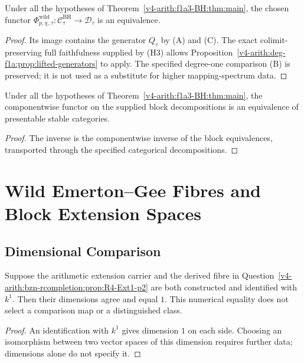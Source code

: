\begin{theorem}
\label{v4-arith:f1a3-BH:thm:single-block-exhaustion}
Under all the hypotheses of Theorem~\ref{v4-arith:f1a3-BH:thm:main},
the chosen functor \(\Phi^{\mathrm{wild}}_{p,\chi,\tau}:
\mathcal C_\tau^{\mathrm{BH}}\to\mathcal D_\tau\) is an equivalence.
\end{theorem}
\begin{proof}
Its image contains the generator \(Q_\tau\) by (A) and (C).
The exact colimit-preserving full faithfulness supplied by (H3)
allows Proposition~\ref{v4-arith:deg-f1a:prop:lifted-generators}
to apply. The specified degree-one comparison (B) is preserved;
it is not used as a substitute for higher mapping-spectrum data.
\end{proof}

\begin{corollary}
\label{v4-arith:f1a3-BH:cor:BH-assembly}
Under all the hypotheses of Theorem~\ref{v4-arith:f1a3-BH:thm:main},
the componentwise functor on the supplied block decompositions is
an equivalence of presentable stable categories.
\end{corollary}
\begin{proof}
The inverse is the componentwise inverse of the block equivalences,
transported through the specified categorical decompositions.
\end{proof}

\section{Wild Emerton--Gee Fibres and Block Extension Spaces}
\label{v4-arith:f1a3-BH:wild-EG-cross-check}

\subsection{Dimensional Comparison}

\begin{proposition}[conditional dimensional comparison at \(p=2\)]
\label{v4-arith:f1a3-BH:prop:dim-comparison-p2}
Suppose the arithmetic extension carrier and the derived fibre
in Question~\ref{v4-arith:bzn-rcompletion:prop:R4-Ext1-p2}
are both constructed and identified with \(k^{1}\).
Then their dimensions agree and equal \(1\). This numerical equality
does not select a comparison map or a distinguished class.
\end{proposition}
\begin{proof}
An identification with \(k^{1}\) gives dimension \(1\) on each
side. Choosing an isomorphism between two vector spaces of this
dimension requires further data; dimensions alone do not specify it.
\end{proof}


